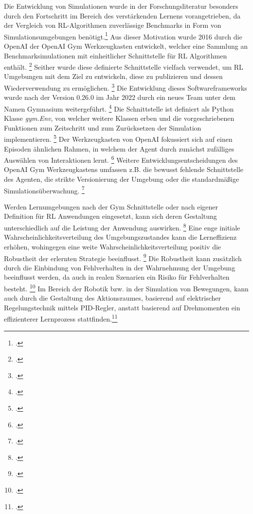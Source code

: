 Die Entwicklung von Simulationen wurde in der Forschungsliteratur besonders durch den Fortschritt im Bereich des verstärkenden Lernens vorangetrieben, da der Vergleich von RL-Algorithmen zuverlässige Benchmarks in Form von Simulationsumgebungen benötigt.\footcite[Vgl.][S. 1]{Brockman.2016}
Aus dieser Motivation wurde 2016 durch die OpenAI der OpenAI Gym Werkzeugkasten entwickelt, welcher eine Sammlung an Benchmarksimulationen mit einheitlicher Schnittstelle für RL Algorithmen enthält. \footcite[Vgl.][S. 1]{Brockman.2016}
Seither wurde diese definierte Schnittstelle vielfach verwendet, um RL Umgebungen mit dem Ziel zu entwickeln, diese zu publizieren und dessen Wiederverwendung zu ermöglichen. \footcite[Vgl.][S. 4]{Schuderer.2021}
Die Entwicklung dieses Softwareframeworks wurde nach der Version 0.26.0 im Jahr 2022 durch ein neues Team unter dem Namen Gymnasium weitergeführt. \footcite[Vgl.][]{GitHub.442023}
Die Schnittstelle ist definiert als Python Klasse \textit{gym.Env}, von welcher weitere Klassen erben und die vorgeschriebenen Funktionen zum Zeitschritt und zum Zurücksetzen der Simulation implementieren. \footcite[Vgl.][S. 4]{Schuderer.2021}
Der Werkzeugkasten von OpenAI fokussiert sich auf einen Episoden ähnlichen Rahmen, in welchem der Agent durch zunächst zufälliges Auswählen von Interaktionen lernt. \footcite[Vgl.][S. 1]{Brockman.2016}
Weitere Entwicklungsentscheidungen des OpenAI Gym Werkzeugkastens umfassen z.B. die bewusst fehlende Schnittstelle des Agenten, die strikte Versionierung der Umgebung oder die standardmäßige Simulationsüberwachung. \footcite[Vgl.][S. 2f.]{Brockman.2016} %

Werden Lernumgebungen nach der Gym Schnittstelle oder nach eigener Definition für RL Anwendungen eingesetzt, kann sich deren Gestaltung unterschiedlich auf die Leistung der Anwendung auswirken. \footcite[Vgl.][S. 1]{Reda.2020}
Eine enge initiale Wahrscheinlichkeitsverteilung des Umgebungszustandes kann die Lerneffizienz erhöhen, wohingegen eine weite Wahrscheinlichkeitsverteilung positiv die Robustheit der erlernten Strategie beeinflusst. \footcite[Vgl.][S. 3]{Reda.2020}
Die Robustheit kann zusätzlich durch die Einbindung von Fehlverhalten in der Wahrnehmung der Umgebung beeinflusst werden, da auch in realen Szenarien ein Risiko für Fehlverhalten besteht. \footcite[Vgl.][S. 2]{YanDuan.2016} 
Im Bereich der Robotik bzw. in der Simulation von Bewegungen, kann auch durch die Gestaltung des Aktionsraumes, basierend auf elektrischer Regelungstechnik mittels PID-Regler, anstatt basierend auf Drehmomenten ein effizienterer Lernprozess stattfinden.\footcite[Vgl.][S. 7]{Reda.2020}

